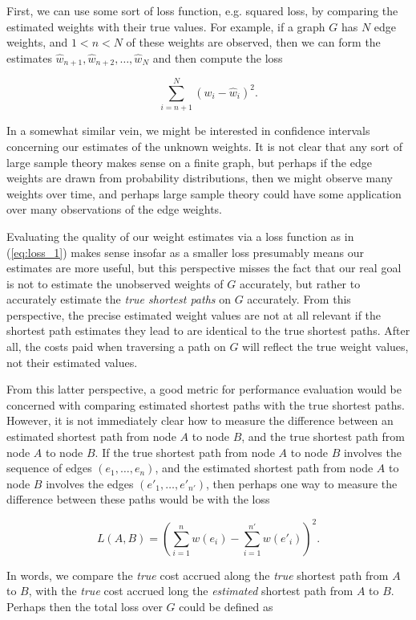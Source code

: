 First, we can use some sort of loss function, e.g. squared loss, by comparing the estimated weights with their true values. For example, if a graph $G$ has $N$ edge weights, and $1 < n < N$ of these weights are observed, then we can form the estimates $\hat w_{n + 1}, \hat w_{n + 2}, \dots, \hat w_N$ and then compute the loss

\begin{equation}\label{eq:loss_1}
    \sum_{i = n + 1}^N \left(w_i - \hat w_i\right)^2.
\end{equation}

In a somewhat similar vein, we might be interested in confidence intervals concerning our estimates of the unknown weights. It is not clear that any sort of large sample theory makes sense on a finite graph, but perhaps if the edge weights are drawn from probability distributions, then we might observe many weights over time, and perhaps large sample theory could have some application over many observations of the edge weights.

Evaluating the quality of our weight estimates via a loss function as in (\ref{eq:loss_1}) makes sense insofar as a smaller loss presumably means our estimates are more useful, but this perspective misses the fact that our real goal is not to estimate the unobserved weights of $G$ accurately, but rather to accurately estimate the \textit{true shortest paths} on $G$ accurately. From this perspective, the precise estimated weight values are not at all relevant if the shortest path estimates they lead to are identical to the true shortest paths. After all, the costs paid when traversing a path on $G$ will reflect the true weight values, not their estimated values.

From this latter perspective, a good metric for performance evaluation would be concerned with comparing estimated shortest paths with the true shortest paths. However, it is not immediately clear how to measure the difference between an estimated shortest path from node $A$ to node $B$, and the true shortest path from node $A$ to node $B$. If the true shortest path from node $A$ to node $B$ involves the sequence of edges $(e_1, \dots, e_n)$, and the estimated shortest path from node $A$ to node $B$ involves the edges $(e'_1, \dots, e'_{n'})$, then perhaps one way to measure the difference between these paths would be with the loss

\[
    L(A, B) = \left(\sum_{i = 1}^n w(e_i) - \sum_{i = 1}^{n'} w(e'_i)\right)^2.
\]

In words, we compare the \textit{true} cost accrued along the \textit{true} shortest path from $A$ to $B$, with the \textit{true} cost accrued long the \textit{estimated} shortest path from $A$ to $B$. Perhaps then the total loss over $G$ could be defined as


